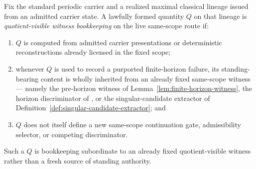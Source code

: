 \begin{manualdefinition}
\label{def:quotient-visible-witness-bookkeeping}
Fix the standard periodic carrier and a realized maximal classical lineage issued from an admitted carrier state. A lawfully formed quantity $Q$ on that lineage is \emph{quotient-visible witness bookkeeping} on the live same-scope route if:
\begin{enumerate}[label=(\roman*), leftmargin=2.2em]
\item $Q$ is computed from admitted carrier presentations or deterministic reconstructions already licensed in the fixed scope;
\item whenever $Q$ is used to record a purported finite-horizon failure, its standing-bearing content is wholly inherited from an already fixed same-scope witness --- namely the pre-horizon witness of Lemma~\ref{lem:finite-horizon-witness}, the horizon discriminator of \HorizonDetectabilityRef{}, or the singular-candidate extractor of Definition~\ref{def:singular-candidate-extractor}; and
\item $Q$ does not itself define a new same-scope continuation gate, admissibility selector, or competing discriminator.
\end{enumerate}
Such a $Q$ is bookkeeping subordinate to an already fixed quotient-visible witness rather than a fresh source of standing authority.
\end{manualdefinition}

